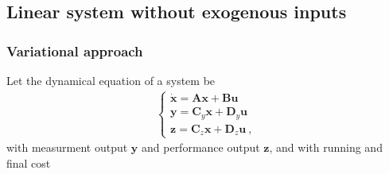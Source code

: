 \documentclass[letterpaper,10pt,english]{jupyterBook}
\begin{document}
\subsection{Linear system without exogenous inputs}
\label{\detokenize{ch/control/optimal-control-full-state-linear:linear-system-without-exogenous-inputs}}\label{\detokenize{ch/control/optimal-control-full-state-linear:control-optimal-full-state-fb-linear}}\label{\detokenize{ch/control/optimal-control-full-state-linear::doc}}

\subsubsection{Variational approach}
\label{\detokenize{ch/control/optimal-control-full-state-linear:variational-approach}}\label{\detokenize{ch/control/optimal-control-full-state-linear:control-optimal-full-state-fb-linear-variational-approach}}
\sphinxAtStartPar
Let the dynamical equation of a system be
\begin{equation*}
\begin{split}\begin{cases}
 \dot{\mathbf{x}} = \mathbf{A} \mathbf{x} + \mathbf{B} \mathbf{u} \\
      \mathbf{y}  = \mathbf{C}_y \mathbf{x} + \mathbf{D}_y \mathbf{u} \\
      \mathbf{z}  = \mathbf{C}_z \mathbf{x} + \mathbf{D}_z \mathbf{u} \ ,
\end{cases}\end{split}
\end{equation*}
\sphinxAtStartPar
with measurment output \(\mathbf{y}\) and performance output \(\mathbf{z}\), and with running and final cost
\end{document}
